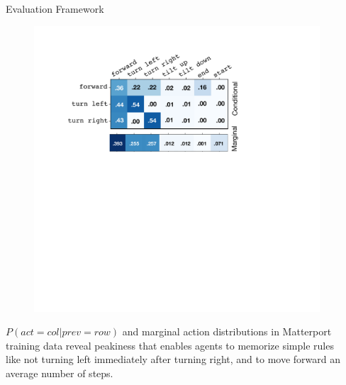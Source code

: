 \documentclass[final]{beamer}
\newcommand{\setblocksize}{\LARGE \centering}
\newcommand{\paragraphbreak}{\vspace{1cm}}
\begin{document}
\begin{frame}{}
\begin{columns}[t]
\begin{column}{.24\linewidth}
\begin{block}{\setblocksize Evaluation Framework}
{\begin{figure}[t]
\includegraphics[width=\columnwidth]{figures/matterport_actions_squeeze_top_big.pdf}
\centering
\end{figure}
$P(act=col | prev=row)$ and marginal action distributions in Matterport training data reveal peakiness that enables agents to memorize simple rules like not turning left immediately after turning right, and to move forward an average number of steps.

}
\end{block}

\end{column}	%

\begin{column}{.49\linewidth}    %

\begin{block}{\setblocksize }
  \vspace{1mm}
\paragraphbreak


\end{block}
\end{column}
\end{columns}
\end{frame}
\end{document}
